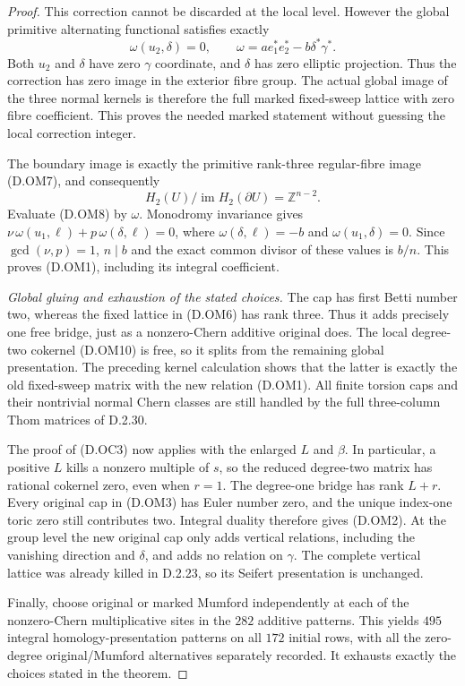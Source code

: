\begin{proof}
This correction cannot be discarded at the local level.
However the global primitive alternating functional
satisfies exactly
\[
 \omega(u_2,\delta)=0,\qquad
 \omega=a e_1^*e_2^*-b\delta^*\gamma^*.                    \tag{D.OM9}
\]
Both $u_2$ and $\delta$ have zero $\gamma$ coordinate,
and $\delta$ has zero elliptic projection. Thus the
correction has zero image in the exterior fibre group.
The actual global image of the three normal kernels is
therefore the full marked fixed-sweep lattice with
zero fibre coefficient. This proves the needed marked
statement without guessing the local correction integer.

The boundary image is exactly the primitive rank-three
regular-fibre image (D.OM7), and consequently
\[
 H_2(U)/\operatorname{im}H_2(\partial U)
                          =\mathbb Z^{n-2}.               \tag{D.OM10}
\]
Evaluate (D.OM8) by $\omega$. Monodromy invariance gives
$\nu\,\omega(u_1,\ell)+p\,\omega(\delta,\ell)=0$,
where $\omega(\delta,\ell)=-b$ and
$\omega(u_1,\delta)=0$. Since $\gcd(\nu,p)=1$,
$n\mid b$ and the exact common divisor of these values
is $b/n$. This proves (D.OM1), including its integral
coefficient.

\emph{Global gluing and exhaustion of the stated choices.}
The cap has first Betti number two, whereas the fixed
lattice in (D.OM6) has rank three. Thus it adds precisely
one free bridge, just as a nonzero-Chern additive original
does. The local degree-two cokernel (D.OM10) is free,
so it splits from the remaining global presentation.
The preceding kernel calculation shows that the latter
is exactly the old fixed-sweep matrix with the new
relation (D.OM1). All finite torsion caps and their
nontrivial normal Chern classes are still handled by
the full three-column Thom matrices of D.2.30.

The proof of (D.OC3) now applies with the enlarged $L$
and $\beta$. In particular, a positive $L$ kills a
nonzero multiple of $s$, so the reduced degree-two
matrix has rational cokernel zero, even when $r=1$.
The degree-one bridge has rank $L+r$. Every original
cap in (D.OM3) has Euler number zero, and the unique
index-one toric zero still contributes two. Integral
duality therefore gives (D.OM2).
At the group level the new original cap only adds
vertical relations, including the vanishing direction
and $\delta$, and adds no relation on $\gamma$.
The complete vertical lattice was already killed in
D.2.23, so its Seifert presentation is unchanged.

Finally, choose original or marked Mumford independently
at each of the nonzero-Chern multiplicative sites in
the $282$ additive patterns. This yields $495$ integral homology-presentation patterns
on all $172$ initial rows, with all the zero-degree
original/Mumford alternatives separately recorded. It
exhausts exactly the choices stated in the theorem.
\end{proof}

